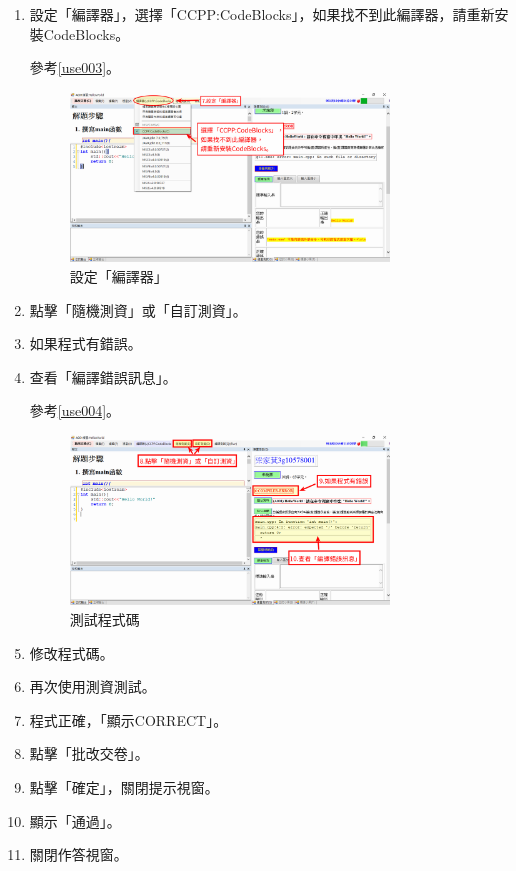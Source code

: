 \begin{enumerate}
\newpage
\item 設定「編譯器」，選擇「CCPP:CodeBlocks」，如果找不到此編譯器，請重新安裝CodeBlocks。

參考\autoref{use003}。
\begin{figure}[H]
	\centering
	\includegraphics[width=0.8\textwidth]{fig/install_and_setting/use_003}
	\caption{設定「編譯器」}
	\label{use003}
\end{figure}


\item 點擊「隨機測資」或「自訂測資」。
\item 如果程式有錯誤。
\item 查看「編譯錯誤訊息」。

參考\autoref{use004}。
\begin{figure}[H]
	\centering
	\includegraphics[width=0.8\textwidth]{fig/install_and_setting/use_004}
	\caption{測試程式碼}
	\label{use004}
\end{figure}


\item 修改程式碼。
\item 再次使用測資測試。
\item 程式正確，「顯示CORRECT」。
\item 點擊「批改交卷」。
\item 點擊「確定」，關閉提示視窗。
\item 顯示「通過」。
\item 關閉作答視窗。


\end{enumerate}
